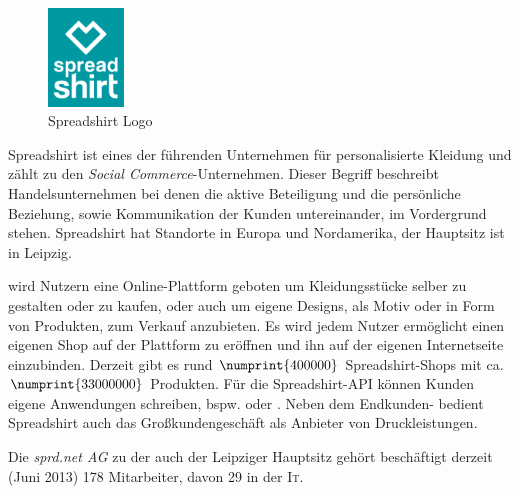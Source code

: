 
\begin{figure}[!htb]
	\centering
		\includegraphics[width=2cm]{resources/sprd_logo_cmyk}
	\caption{Spreadshirt Logo}
	\label{fig:spreadshirtLogo}
\end{figure}

Spreadshirt ist eines der führenden Unternehmen für personalisierte Kleidung und zählt zu den \emph{Social Commerce}-Unternehmen. Dieser Begriff beschreibt Handelsunternehmen bei denen die aktive Beteiligung und die persönliche Beziehung, sowie Kommunikation der Kunden untereinander, im Vordergrund stehen. 
Spreadshirt hat Standorte in Europa und Nordamerika, der Hauptsitz ist in Leipzig. 

wird Nutzern eine Online-Plattform geboten um Kleidungsstücke selber zu gestalten oder zu kaufen, oder auch um eigene Designs, als Motiv oder in Form von Produkten, zum Verkauf anzubieten. 
Es wird jedem Nutzer ermöglicht einen eigenen Shop auf der Plattform zu eröffnen und ihn auf der eigenen Internetseite einzubinden. Derzeit gibt es rund $\numprint{400000}$ Spreadshirt-Shops mit ca. $\numprint{33000000}$ Produkten.
Für die Spreadshirt-API können Kunden eigene Anwendungen schreiben, bspw.  \cite{zufallsshirt} oder  \cite{soundslikecotton}.
Neben dem Endkunden- bedient Spreadshirt auch das Großkundengeschäft als Anbieter von Druckleistungen.

Die \emph{sprd.net AG} zu der auch der Leipziger Hauptsitz gehört beschäftigt derzeit (Juni 2013) 178 Mitarbeiter, davon 29 in der \textsc{It}.
